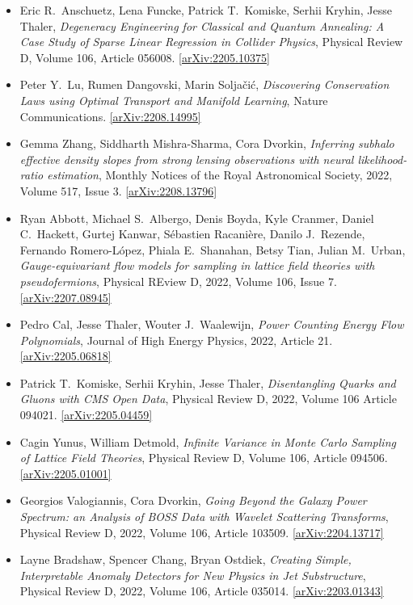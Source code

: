 \begin{itemize}
\item Eric R.\  Anschuetz, Lena Funcke, Patrick T.\  Komiske, Serhii Kryhin, Jesse Thaler, \textit{Degeneracy Engineering for Classical and Quantum Annealing: A Case Study of Sparse Linear Regression in Collider Physics}, Physical Review D, Volume 106, Article 056008. \href{https://arxiv.org/abs/2205.10375}{[arXiv:2205.10375]} 
\item Peter Y.\  Lu, Rumen Dangovski, Marin Soljačić, \textit{Discovering Conservation Laws using Optimal Transport and Manifold Learning}, Nature Communications. \href{https://arxiv.org/abs/2208.14995}{[arXiv:2208.14995]} 
\item Gemma Zhang, Siddharth Mishra-Sharma, Cora Dvorkin, \textit{Inferring subhalo effective density slopes from strong lensing observations with neural likelihood-ratio estimation}, Monthly Notices of the Royal Astronomical Society, 2022, Volume 517, Issue 3. \href{https://arxiv.org/abs/2208.13796}{[arXiv:2208.13796]} 
\item Ryan Abbott, Michael S.\  Albergo, Denis Boyda, Kyle Cranmer, Daniel C.\  Hackett, Gurtej Kanwar, Sébastien Racanière, Danilo J.\  Rezende, Fernando Romero-López, Phiala E.\  Shanahan, Betsy Tian, Julian M.\  Urban, \textit{Gauge-equivariant flow models for sampling in lattice field theories with pseudofermions}, Physical REview D, 2022, Volume 106, Issue 7. \href{https://arxiv.org/abs/2207.08945}{[arXiv:2207.08945]} 
\item Pedro Cal, Jesse Thaler, Wouter J.\  Waalewijn, \textit{Power Counting Energy Flow Polynomials}, Journal of High Energy Physics, 2022, Article 21. \href{https://arxiv.org/abs/2205.06818}{[arXiv:2205.06818]} 
\item Patrick T.\  Komiske, Serhii Kryhin, Jesse Thaler, \textit{Disentangling Quarks and Gluons with CMS Open Data}, Physical Review D, 2022, Volume 106 Article 094021. \href{https://arxiv.org/abs/2205.04459}{[arXiv:2205.04459]} 
\item Cagin Yunus, William Detmold, \textit{Infinite Variance in Monte Carlo Sampling of Lattice Field Theories}, Physical Review D, Volume 106, Article 094506. \href{https://arxiv.org/abs/2205.01001}{[arXiv:2205.01001]} 
\item Georgios Valogiannis, Cora Dvorkin, \textit{Going Beyond the Galaxy Power Spectrum: an Analysis of BOSS Data with Wavelet Scattering Transforms}, Physical Review D, 2022, Volume 106, Article 103509. \href{https://arxiv.org/abs/2204.13717}{[arXiv:2204.13717]} 
\item Layne Bradshaw, Spencer Chang, Bryan Ostdiek, \textit{Creating Simple, Interpretable Anomaly Detectors for New Physics in Jet Substructure}, Physical Review D, 2022, Volume 106, Article 035014. \href{https://arxiv.org/abs/2203.01343}{[arXiv:2203.01343]} 

\end{itemize}
